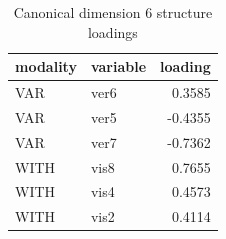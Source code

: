 \begin{table}
\caption{Canonical dimension 6 structure loadings}
\label{tab:cca_dimension_6_loadings}
\begin{tabular}{llr}
\toprule
modality & variable & loading \\
\midrule
VAR & ver6 & 0.3585 \\
VAR & ver5 & -0.4355 \\
VAR & ver7 & -0.7362 \\
WITH & vis8 & 0.7655 \\
WITH & vis4 & 0.4573 \\
WITH & vis2 & 0.4114 \\
\bottomrule
\end{tabular}
\end{table}
